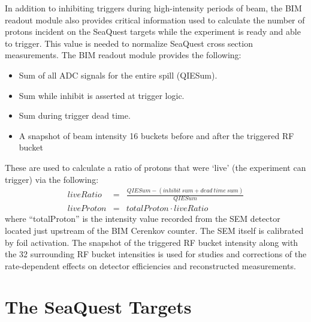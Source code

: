 In addition to inhibiting triggers during high-intensity periods of beam, the BIM readout module also provides critical
information used to calculate the number of protons incident on the SeaQuest targets while the experiment is ready
and able to trigger. This value is needed to normalize SeaQuest cross section measurements. The BIM readout module provides the following:
\begin{itemize}
\item Sum of all ADC signals for the entire spill (QIESum).
\item Sum while inhibit is asserted at trigger logic.
\item Sum during trigger dead time.
\item A snapshot of beam intensity 16 buckets before and after the triggered RF bucket
\end{itemize}

These are used to calculate a ratio of protons that were `live' (the experiment can trigger) via the following:
\begin{eqnarray}
	liveRatio & = & \frac{QIESum - (inhibit\ sum + dead\ time\ sum)}{QIESum} \\
	liveProton & = & totalProton \cdot liveRatio
	\label{eqn:liveproton}
\end{eqnarray}
where ``totalProton'' is the intensity value recorded from the SEM detector located just upstream of the BIM Cerenkov counter.
The SEM itself is calibrated by foil activation. The snapshot of the triggered RF bucket intensity along with the 32
surrounding RF bucket intensities is used for studies and corrections of the rate-dependent effects on detector efficiencies
and reconstructed measurements.

\section{The SeaQuest Targets}

